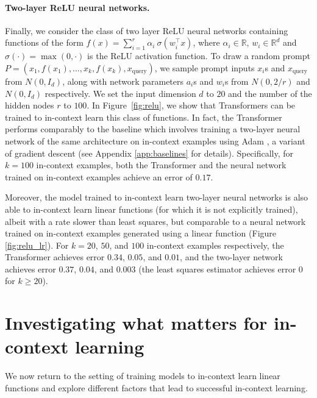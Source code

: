 \documentclass{article}
\begin{document}
\paragraph{Two-layer ReLU neural networks.}
Finally, we consider the class of two layer ReLU neural 
networks containing functions of the form $f(x) = \sum_{i=1}^r \alpha_i \ \sigma(w_i^\top x)$, where $\alpha_i \in \mathbb{R}$, $w_i \in \mathbb{R}^d$ and $\sigma(\cdot) = \max(0, \cdot)$ is the ReLU activation function.
To draw a random prompt $P = (x_1, f(x_1), \ldots, x_k, f(x_k), x_\text{query})$, we sample prompt inputs $x_i$s and $x_\text{query}$ from $N(0, I_d)$, along with network parameters $a_i$s and $w_i$s from $N(0, {2/r})$ and $N(0, I_d)$ respectively. We set the input dimension $d$ to $20$ and the number of the hidden nodes $r$ to $100$. 
In Figure~\ref{fig:relu}, we show that Transformers can be trained to in-context learn this class of functions.
In fact, the Transformer performs comparably to the baseline 
 which involves training a two-layer neural network of the same architecture on in-context examples using Adam \citep{kingma2014adam}, a variant of gradient descent
(see Appendix \ref{app:baselines} for details). Specifically, for $k=100$ in-context examples, both the Transformer and the neural network trained on in-context examples achieve an error of $0.17$.

Moreover, the model trained to in-context learn two-layer neural networks is also able to in-context learn linear functions (for which it is not explicitly trained), albeit with a rate slower than least squares, but comparable to a neural network trained on in-context examples generated using a linear function (Figure \ref{fig:relu_lr}). For $k=20$, $50$, and $100$ in-context examples respectively, the Transformer achieves error $0.34$, $0.05$, and $0.01$, and the two-layer network achieves error $0.37$, $0.04$, and $0.003$ (the least squares estimator achieves error $0$ for $k\geq 20$).

\section{Investigating what matters for in-context learning}
\label{sec:factors}

We now return to the setting of training models to in-context learn linear functions and explore different factors that lead to successful in-context learning.
\end{document}
